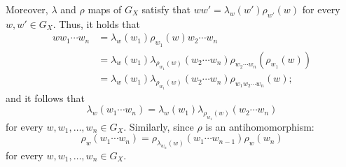 \documentclass[12pt, a4paper, english]{article}
\theoremstyle{definition}
\theoremstyle{remark}
\newtheorem*{nota}{Remark}
\begin{document}
Moreover, $\lambda$ and $\rho$ maps of $G_X$ satisfy that $ww' = \lambda_w(w')\rho_{w'}(w)$ for every $w, w'\in G_X$. Thus, it holds that
\begin{align}
ww_1\cdots w_n & = \lambda_{w}(w_1)\rho_{w_1}(w)w_2\cdots w_n \nonumber \\
& = \lambda_{w}(w_1)\lambda_{\rho_{w_1}(w)}(w_2\cdots w_n) \rho_{w_2\cdots w_n}(\rho_{w_1}(w))  \nonumber \\
& = \lambda_{w}(w_1)\lambda_{\rho_{w_1}(w)}(w_2\cdots w_n) \rho_{w_1w_2\cdots w_n}(w); \nonumber
\end{align}
and it follows that
\begin{equation}
\label{eq:lambda-prod-GX}
\lambda_{w}(w_1\cdots w_n) = \lambda_{w}(w_1)\lambda_{\rho_{w_1}(w)}(w_2\cdots w_n)
\end{equation}
for every $w,w_1, \ldots, w_n \in G_X$. Similarly, since $\rho$ is an antihomomorphism:
\begin{equation}
\label{eq:rho-prod-GX}
\rho_{w}(w_1\cdots w_n) = \rho_{\lambda_{w_n}(w)}(w_1\cdots w_{n-1})\rho_{w}(w_n)
\end{equation}
for every $w,w_1, \ldots, w_n \in G_X$.
%
\end{document}
